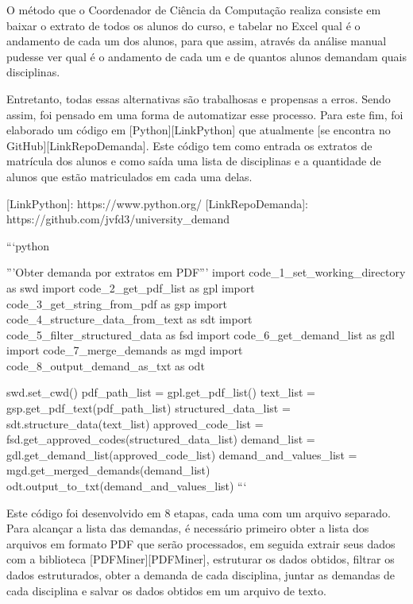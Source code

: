         O método que o Coordenador de Ciência da Computação realiza consiste em baixar o extrato de todos os alunos do curso, e tabelar no Excel qual é o andamento de cada um dos alunos, para que assim, através da análise manual pudesse ver qual é o andamento de cada um e de quantos alunos demandam quais disciplinas.

        Entretanto, todas essas alternativas são trabalhosas e propensas a erros. Sendo assim, foi pensado em uma forma de automatizar esse processo. Para este fim, foi elaborado um código em [Python][LinkPython] que atualmente [se encontra no GitHub][LinkRepoDemanda]. Este código tem como entrada os extratos de matrícula dos alunos e como saída uma lista de disciplinas e a quantidade de alunos que estão matriculados em cada uma delas.

        [LinkPython]: https://www.python.org/
        [LinkRepoDemanda]: https://github.com/jvfd3/university_demand

        ```python

        '''Obter demanda por extratos em PDF'''
        import code_1_set_working_directory     as swd
        import code_2_get_pdf_list              as gpl
        import code_3_get_string_from_pdf       as gsp
        import code_4_structure_data_from_text  as sdt
        import code_5_filter_structured_data    as fsd
        import code_6_get_demand_list           as gdl
        import code_7_merge_demands             as mgd
        import code_8_output_demand_as_txt      as odt

        swd.set_cwd()
        pdf_path_list           = gpl.get_pdf_list()
        text_list               = gsp.get_pdf_text(pdf_path_list)
        structured_data_list    = sdt.structure_data(text_list)
        approved_code_list      = fsd.get_approved_codes(structured_data_list)
        demand_list             = gdl.get_demand_list(approved_code_list)
        demand_and_values_list  = mgd.get_merged_demands(demand_list)
        odt.output_to_txt(demand_and_values_list)
        ```

        Este código foi desenvolvido em 8 etapas, cada uma com um arquivo separado. Para alcançar a lista das demandas, é necessário primeiro obter a lista dos arquivos em formato PDF que serão processados, em seguida extrair seus dados com a biblioteca [PDFMiner][PDFMiner], estruturar os dados obtidos, filtrar os dados estruturados, obter a demanda de cada disciplina, juntar as demandas de cada disciplina e salvar os dados obtidos em um arquivo de texto.

